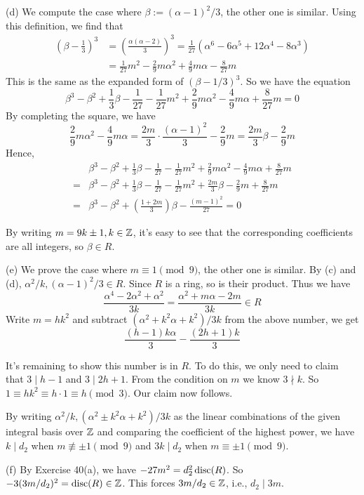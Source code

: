 \documentclass[../Marcus.tex]{subfiles}
\begin{document}
(d) We compute the case where $\beta:=(\alpha-1)^2/3$, the other one is similar. Using this definition, we find that
\begin{align*}
    \left(\beta-\frac{1}{3}\right)^3 &= \left(\frac{\alpha(\alpha-2)}{3}\right)^3 = \frac{1}{27}(\alpha^6-6\alpha^5+12\alpha^4-8\alpha^3) \\
    &= \frac{1}{27}m^2-\frac{2}{9}m\alpha^2+\frac{4}{9}m\alpha-\frac{8}{27}m
\end{align*}
This is the same as the expanded form of $(\beta-1/3)^3$. So we have the equation $$\beta^3-\beta^2+\frac{1}{3}\beta-\frac{1}{27}-\frac{1}{27}m^2+\frac{2}{9}m\alpha^2-\frac{4}{9}m\alpha+\frac{8}{27}m=0$$
By completing the square, we have $$\frac{2}{9}m\alpha^2-\frac{4}{9}m\alpha = \frac{2m}{3}\cdot\frac{(\alpha-1)^2}{3}-\frac{2}{9}m = \frac{2m}{3}\beta-\frac{2}{9}m$$
Hence,
\begin{align*}
    &\beta^3-\beta^2+\frac{1}{3}\beta-\frac{1}{27}-\frac{1}{27}m^2+\frac{2}{9}m\alpha^2-\frac{4}{9}m\alpha+\frac{8}{27}m \\
    ={} &\beta^3-\beta^2+\frac{1}{3}\beta-\frac{1}{27}-\frac{1}{27}m^2+\frac{2m}{3}\beta-\frac{2}{9}m+\frac{8}{27}m \\
    ={} &\beta^3-\beta^2+\left(\frac{1+2m}{3}\right)\beta-\frac{(m-1)^2}{27} = 0
\end{align*}

By writing $m=9k\pm1,k\in\mathbb{Z}$, it's easy to see that the corresponding coefficients are all integers, so $\beta\in R$.

(e) We prove the case where $m\equiv 1\pmod{9}$, the other one is similar. By (c) and (d), $\alpha^2/k,(\alpha-1)^2/3\in R$. Since $R$ is a ring, so is their product. Thus we have $$\frac{\alpha^4-2\alpha^2+\alpha^2}{3k}=\frac{\alpha^2+m\alpha-2m}{3k}\in R$$
Write $m=hk^2$ and subtract $(\alpha^2+k^2\alpha+k^2)/3k$ from the above number, we get $$\frac{(h-1)k\alpha}{3}-\frac{(2h+1)k}{3}$$

It's remaining to show this number is in $R$. To do this, we only need to claim that $3\mid h-1$ and $3\mid 2h+1$. From the condition on $m$ we know $3\nmid k$. So $1\equiv hk^2\equiv h\cdot 1 \equiv h\pmod{3}$. Our claim now follows.

By writing $\alpha^2/k,(\alpha^2\pm k^2\alpha+k^2)/3k$ as the linear combinations of the given integral basis over $\mathbb{Z}$ and comparing the coefficient of the highest power, we have $k\mid d_2$ when $m\not\equiv \pm1 \pmod{9}$ and $3k\mid d_2$ when $m\equiv \pm1 \pmod{9}$.

(f) By Exercise 40(a), we have $-27m^2=d_2^2\operatorname{disc}(R)$. So $-3(3m/d_2)^2=\operatorname{disc}(R)\in\mathbb{Z}$. This forces $3m/d_2\in\mathbb{Z}$, i.e., $d_2\mid 3m$.
\end{document}
